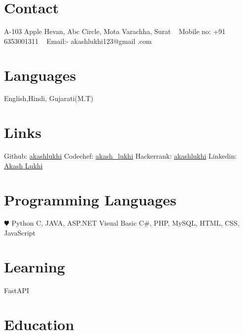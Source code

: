 \documentclass[]{cv-style}
\begin{document}


\begin{aside}
%
\section{Contact}
A-103 Apple Hevan,
Abc Circle, Mota 
Varachha, Surat
~
Mobile no:
+91 6353001311
~
Email:-
akashlukhi123@gmail
.com
%

\section{Languages}
English,Hindi,
Gujarati(M.T)
%


\section{Links}
Github: \href{https://github.com/akashlukhi}{akashlukhi}
Codechef: \href{https://www.codechef.com/users/akash_lukhi}{akash\_lukhi}
Hackerrank: \href{https://www.hackerrank.com/akashlukhi}{akashlukhi}
Linkedin: \href{https://www.linkedin.com/in/akash-lukhi-b0540a213/}{Akash Lukhi}
%

\section{Programming
   Languages}
{\color{red} $\varheartsuit$} Python
C, JAVA, ASP.NET
Visual Basic C\#,
PHP, MySQL, HTML,
CSS, JavaScript
%

\section{Learning}
FastAPI

\end{aside}




\section{Education}
\end{document}

